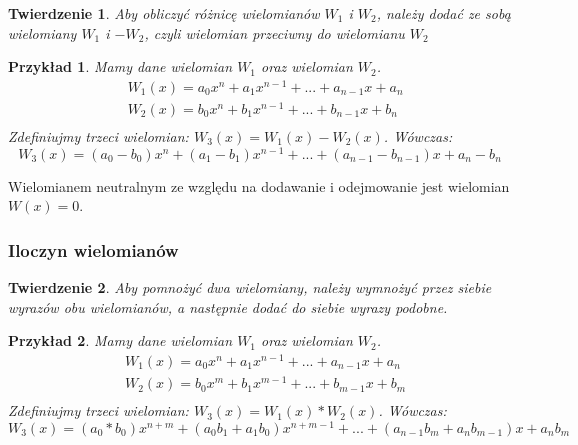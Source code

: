 \documentclass[twoside,a4paper]{book}
\newtheorem{theorem}{Twierdzenie}
\newtheorem{example}{Przykład}
\begin{document}
\begin{theorem}
	Aby obliczyć różnicę wielomianów $W_1$ i $W_2$, należy dodać ze sobą wielomiany $W_1$ i $-W_2$, czyli wielomian przeciwny do wielomianu $W_2$
\end{theorem}

\begin{example}
	Mamy dane wielomian $W_1$ oraz wielomian $W_2$.
	\begin{equation}
	\begin{split}
	&W_1(x) = a_0x^n + a_1x^{n-1} + ... + a_{n-1}x + a_n \\
	&W_2(x) = b_0x^n + b_1x^{n-1} + ... + b_{n-1}x + b_n \\
	\end{split}
	\end{equation}
	Zdefiniujmy trzeci wielomian: $W_3(x) = W_1(x) - W_2(x)$. Wówczas:
	\begin{equation}
		W_3(x) = (a_0-b_0)x^n + (a_1-b_1)x^{n-1} + ... + (a_{n-1} - b_{n-1})x + a_n - b_n
	\end{equation}
\end{example}

Wielomianem neutralnym ze względu na dodawanie i odejmowanie jest wielomian $W(x)=0$.

\subsubsection{Iloczyn wielomianów}

\begin{theorem}
	Aby pomnożyć dwa wielomiany, należy wymnożyć przez siebie wyrazów obu wielomianów, a następnie dodać do siebie wyrazy podobne.
\end{theorem}

\begin{example}
	Mamy dane wielomian $W_1$ oraz wielomian $W_2$.
	\begin{equation}
	\begin{split}
	&W_1(x) = a_0x^n + a_1x^{n-1} + ... + a_{n-1}x + a_n \\
	&W_2(x) = b_0x^m + b_1x^{m-1} + ... + b_{m-1}x + b_m \\
	\end{split}
	\end{equation}
	Zdefiniujmy trzeci wielomian: $W_3(x) = W_1(x) * W_2(x)$. Wówczas:
	\begin{equation}
	W_3(x) = (a_0*b_0)x^{n+m} + (a_0b_1+a_1b_0)x^{n+m-1} + ... + (a_{n-1}b_m + a_nb_{m-1})x + a_nb_m
	\end{equation}
\end{example}
\end{document}
